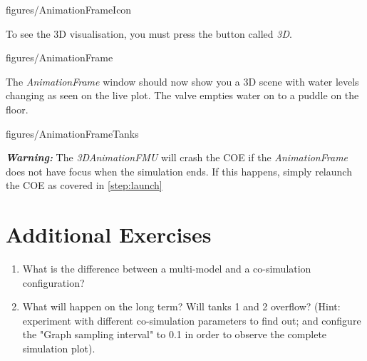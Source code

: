 \documentclass[11pt,a4paper]{../tutorial}
\begin{document}
\begin{instructions}
    \begin{annotation}[scale=0.6]{figures/AnimationFrameIcon}
    \end{annotation}

    To see the 3D visualisation, you must press the button called \emph{3D}.

    \begin{annotation}[width=0.5\linewidth]{figures/AnimationFrame}
    \end{annotation}

\newpage
\item The \emph{AnimationFrame} window should now show you a 3D scene with water levels changing as seen on the live plot. The valve empties water on to a puddle on the floor.

    \begin{annotation}[width=0.5\linewidth]{figures/AnimationFrameTanks}
    \end{annotation}

    \textbf{\emph{Warning:}} The \emph{3DAnimationFMU} will crash the COE if the \emph{AnimationFrame} does not have focus when the simulation ends. If this happens, simply relaunch the COE as covered in \ref{step:launch}


\end{instructions}

\section{Additional Exercises}

\begin{enumerate}
  \item What is the difference between a multi-model and a co-simulation configuration?
  
	\item What will happen on the long term? Will tanks 1 and 2 overflow? (Hint: experiment with different co-simulation parameters to find out; and configure the "Graph sampling interval" to 0.1 in order to observe the complete simulation plot).
\end{enumerate}
\end{document}
